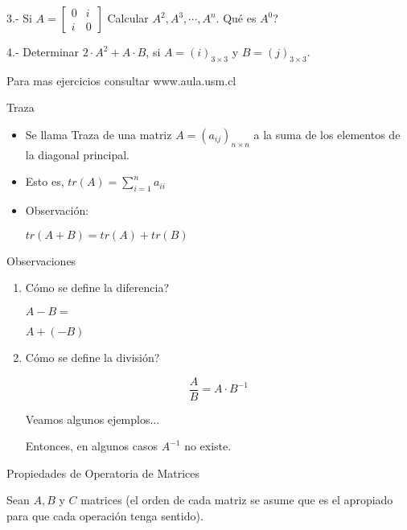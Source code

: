 3.- Si
$ A= \begin{bmatrix}
0 & i \\
i &  0 
\end{bmatrix}$
Calcular $A^2, A^3, \cdots, A^n$.
Qué es  $A^0$?

4.- Determinar $2 \cdot A^2 +A \cdot B$,  si $A = (i )_{3\times 3}$ y $B = (j )_{3\times 3}$.


Para mas ejercicios consultar www.aula.usm.cl


{Traza}

\begin{itemize}
\item
Se llama Traza de una matriz $A = (a_{ij})_{n \times n}$ a la suma de los elementos de la diagonal principal.

\item
Esto es, $tr(A) = \sum_{i=1}^n a_{ii}$

\item
Observación:

$tr(A+B) = tr(A) + tr(B)$
\end{itemize}


{Observaciones}

\begin{enumerate}
\item
Cómo se define la diferencia?

 $A-B=$
 
$A+(-B)$

\item
Cómo se define la división?
 
$$\frac{A}{B}=A \cdot B^{-1}$$

Veamos algunos ejemplos...

Entonces,  en algunos casos $A^{-1}$ no existe.
\end{enumerate}


{Propiedades de Operatoria de Matrices}

Sean $A, B$ y $C$ matrices (el orden de cada matriz se asume que es el apropiado para que cada operación tenga sentido).

